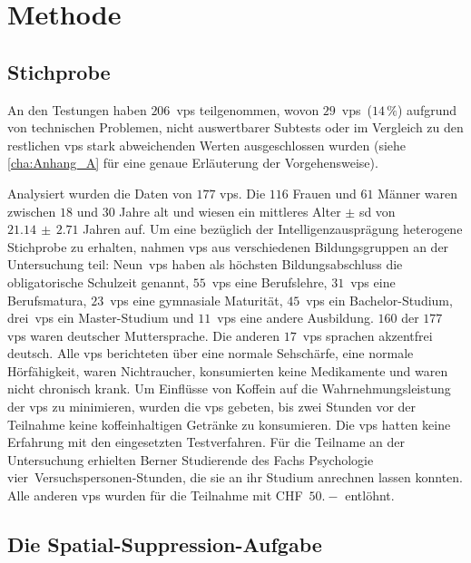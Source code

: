 \documentclass[11pt, twoside, a4paper]{book}		%
\begin{document}
\chapter{Methode \label{cha:Methode}}

\section{Stichprobe \label{sec:Stichprobe}}

An den Testungen haben $206$~\glspl{vp} teilgenommen, wovon $29$~\glspl{vp}~($14\,\%$) aufgrund von technischen Problemen, nicht auswertbarer Subtests oder im Vergleich zu den restlichen \glspl{vp} stark abweichenden Werten ausgeschlossen wurden (siehe \autoref{cha:Anhang_A} für eine genaue Erläuterung der Vorgehensweise).

Analysiert wurden die Daten von $177$ \glspl{vp}. Die $116$ Frauen und $61$ Männer waren zwischen $18$ und $30$ Jahre alt und wiesen ein mittleres Alter $\pm$ \gls{sd} von $21.14\,\pm\,2.71$ Jahren auf. 
Um eine bezüglich der Intelligenzausprägung heterogene Stichprobe zu erhalten, nahmen \glspl{vp} aus verschiedenen Bildungsgruppen an der Untersuchung teil:
Neun~\glspl{vp} haben als höchsten Bildungsabschluss die obligatorische Schulzeit genannt,
$55$~\glspl{vp} eine Berufslehre,
$31$~\glspl{vp} eine Berufsmatura,
$23$~\glspl{vp} eine gymnasiale Maturität,
$45$~\glspl{vp} ein Bachelor-Studium,
drei~\glspl{vp} ein Master-Studium und 
$11$~\glspl{vp} eine andere Ausbildung.
$160$ der $177$ \glspl{vp} waren deutscher Muttersprache. Die anderen $17$~\glspl{vp} sprachen akzentfrei deutsch. Alle \glspl{vp} berichteten über eine normale Sehschärfe, eine normale Hörfähigkeit, waren Nichtraucher, konsumierten keine Medikamente und waren nicht chronisch krank. Um Einflüsse von Koffein auf die Wahrnehmungsleistung \citep[][]{Stough1995} der \glspl{vp} zu minimieren, wurden die \glspl{vp} gebeten, bis zwei Stunden vor der Teilnahme keine koffeinhaltigen Getränke zu konsumieren. Die \glspl{vp} hatten keine Erfahrung mit den eingesetzten Testverfahren. 
Für die Teilname an der Untersuchung erhielten Berner Studierende des Fachs Psychologie vier~Ver\-suchs\-per\-sonen-Stun\-den, die sie an ihr Studium anrechnen lassen konnten. Alle anderen \glspl{vp} wurden für die Teilnahme mit CHF~$50.-$ entlöhnt.




\section{Die Spatial-Suppression-Aufgabe \label{sec:}}
\end{document}
